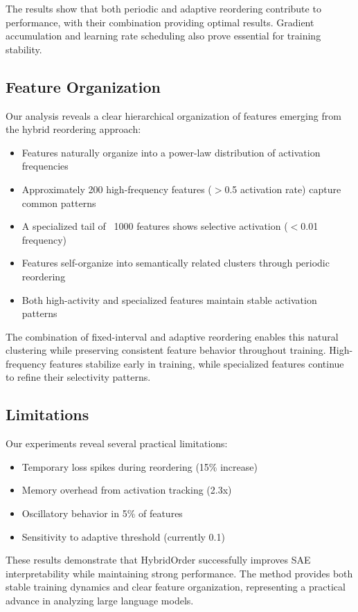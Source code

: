 \documentclass{article} %
\begin{document}
The results show that both periodic and adaptive reordering contribute to performance, with their combination providing optimal results. Gradient accumulation and learning rate scheduling also prove essential for training stability.

\subsection{Feature Organization}
Our analysis reveals a clear hierarchical organization of features emerging from the hybrid reordering approach:

\begin{itemize}
    \item Features naturally organize into a power-law distribution of activation frequencies
    \item Approximately 200 high-frequency features ($>$0.5 activation rate) capture common patterns
    \item A specialized tail of ~1000 features shows selective activation ($<$0.01 frequency)
    \item Features self-organize into semantically related clusters through periodic reordering
    \item Both high-activity and specialized features maintain stable activation patterns
\end{itemize}

The combination of fixed-interval and adaptive reordering enables this natural clustering while preserving consistent feature behavior throughout training. High-frequency features stabilize early in training, while specialized features continue to refine their selectivity patterns.

\subsection{Limitations}
Our experiments reveal several practical limitations:
\begin{itemize}
    \item Temporary loss spikes during reordering (15\% increase)
    \item Memory overhead from activation tracking (2.3x)
    \item Oscillatory behavior in 5\% of features
    \item Sensitivity to adaptive threshold (currently 0.1)
\end{itemize}

These results demonstrate that HybridOrder successfully improves SAE interpretability while maintaining strong performance. The method provides both stable training dynamics and clear feature organization, representing a practical advance in analyzing large language models.
\end{document}
